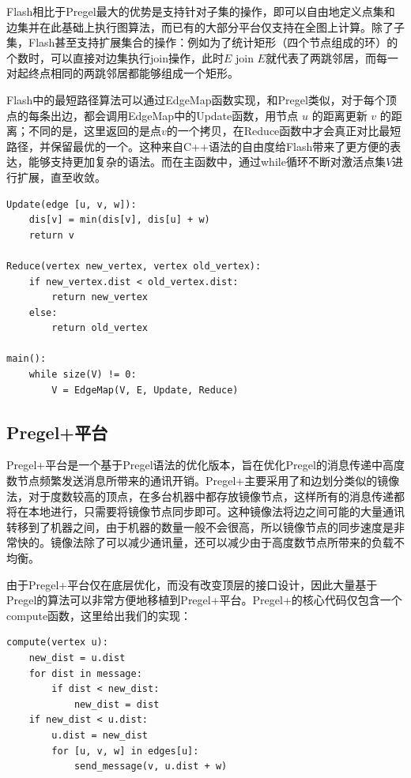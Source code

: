 Flash相比于Pregel最大的优势是支持针对子集的操作，即可以自由地定义点集和边集并在此基础上执行图算法，而已有的大部分平台仅支持在全图上计算。除了子集，Flash甚至支持扩展集合的操作：例如为了统计矩形（四个节点组成的环）的个数时，可以直接对边集执行join操作，此时$E$ join $E$就代表了两跳邻居，而每一对起终点相同的两跳邻居都能够组成一个矩形。

Flash中的最短路径算法可以通过EdgeMap函数实现，和Pregel类似，对于每个顶点的每条出边，都会调用EdgeMap中的Update函数，用节点 $u$ 的距离更新 $v$ 的距离；不同的是，这里返回的是点$v$的一个拷贝，在Reduce函数中才会真正对比最短路径，并保留最优的一个。这种来自C++语法的自由度给Flash带来了更方便的表达，能够支持更加复杂的语法。而在主函数中，通过while循环不断对激活点集$V$进行扩展，直至收敛。

\begin{lstlisting}
Update(edge [u, v, w]):
    dis[v] = min(dis[v], dis[u] + w)
    return v

Reduce(vertex new_vertex, vertex old_vertex):
    if new_vertex.dist < old_vertex.dist:
        return new_vertex
    else:
        return old_vertex

main():
    while size(V) != 0:
        V = EdgeMap(V, E, Update, Reduce)
\end{lstlisting}


\subsection{Pregel+平台}

Pregel+平台是一个基于Pregel语法的优化版本，旨在优化Pregel的消息传递中高度数节点频繁发送消息所带来的通讯开销。Pregel+主要采用了和边划分类似的镜像法，对于度数较高的顶点，在多台机器中都存放镜像节点，这样所有的消息传递都将在本地进行，只需要将镜像节点同步即可。这种镜像法将边之间可能的大量通讯转移到了机器之间，由于机器的数量一般不会很高，所以镜像节点的同步速度是非常快的。镜像法除了可以减少通讯量，还可以减少由于高度数节点所带来的负载不均衡。

由于Pregel+平台仅在底层优化，而没有改变顶层的接口设计，因此大量基于Pregel的算法可以非常方便地移植到Pregel+平台。Pregel+的核心代码仅包含一个compute函数，这里给出我们的实现：
\begin{lstlisting}
compute(vertex u):
    new_dist = u.dist
    for dist in message:
        if dist < new_dist:
            new_dist = dist
    if new_dist < u.dist:
        u.dist = new_dist
        for [u, v, w] in edges[u]:
            send_message(v, u.dist + w)
\end{lstlisting}

